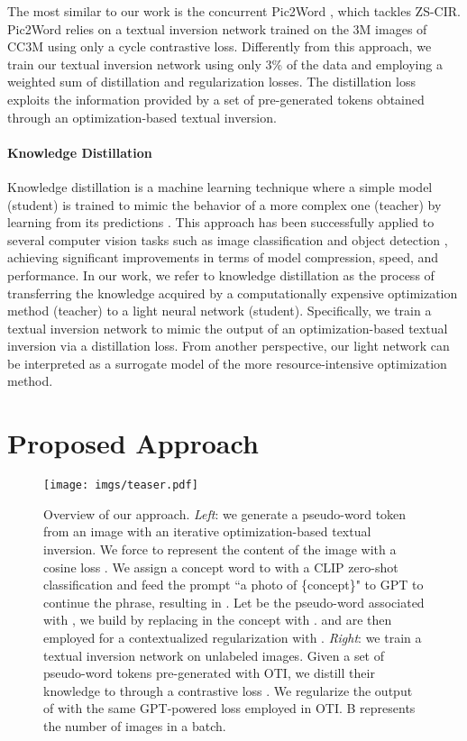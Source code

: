 \documentclass[10pt,twocolumn,letterpaper]{article}
\begin{document}
The most similar to our work is the concurrent Pic2Word \cite{saito2023pic2word}, which tackles ZS-CIR. Pic2Word relies on a textual inversion network trained on the 3M images of CC3M \cite{sharma2018conceptual} using only a cycle contrastive loss. Differently from this approach, we train our textual inversion network using only 3\% of the data and employing a weighted sum of distillation and regularization losses. The distillation loss exploits the information provided by a set of pre-generated tokens obtained through an optimization-based textual inversion. 

\paragraph{Knowledge Distillation}
Knowledge distillation is a machine learning technique where a simple model (student) is trained to mimic the behavior of a more complex one (teacher) by learning from its predictions \cite{hinton2015distilling}. This approach has been successfully applied to several computer vision tasks such as image classification \cite{hinton2015distilling, romero2014fitnets} and object detection \cite{chen2017learning}, achieving significant improvements in terms of model compression, speed, and performance. In our work, we refer to knowledge distillation as the process of transferring the knowledge acquired by a computationally expensive optimization method (teacher) to a light neural network (student). Specifically, we train a textual inversion network to mimic the output of an optimization-based textual inversion via a distillation loss. From another perspective, our light network can be interpreted as a surrogate model of the more resource-intensive optimization method.

\section{Proposed Approach} \label{sec:proposed_approach}

\begin{figure*}[!htb]
    \centering
    \texttt{[image: imgs/teaser.pdf]}
    \vspace{-3.5ex}
    \caption{Overview of our approach. \textit{Left}: we generate a pseudo-word token  from an image  with an iterative optimization-based textual inversion. We force  to represent the content of the image with a cosine loss .
    We assign a concept word to  with a CLIP zero-shot classification and feed the prompt ``a photo of \{concept\}" to GPT to continue the phrase, resulting in . Let  be the pseudo-word associated with , we build  by replacing in  the concept with .  and  are then employed for a contextualized regularization with . \textit{Right}: we train a textual inversion network  on unlabeled images. Given a set of pseudo-word tokens pre-generated with OTI, we distill their knowledge to  through a contrastive loss . We regularize the output of  with the same GPT-powered loss  employed in OTI. B represents the number of images in a batch.
    }
    \vspace{-4pt}
    \label{fig:teaser}
\end{figure*}
\end{document}
